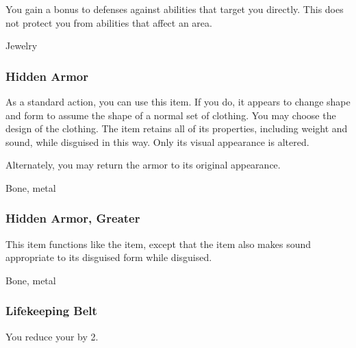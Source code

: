 You gain a  bonus to defenses against  abilities that target you directly.
This does not protect you from abilities that affect an area.



 


 Jewelry


\lowercase{\hypertarget{item:Hidden Armor}{}}\label{item:Hidden Armor}
\hypertarget{item:Hidden Armor}{\subsubsection{Hidden Armor\hfill{}}}

As a standard action, you can use this item.
If you do, it appears to change shape and form to assume the shape of a normal set of clothing.
You may choose the design of the clothing.
The item retains all of its properties, including weight and sound, while disguised in this way.
Only its visual appearance is altered.

Alternately, you may return the armor to its original appearance.



 


 Bone, metal


\lowercase{\hypertarget{item:Hidden Armor, Greater}{}}\label{item:Hidden Armor, Greater}
\hypertarget{item:Hidden Armor, Greater}{\subsubsection{Hidden Armor, Greater\hfill{}}}

This item functions like the  item, except that the item also makes sound appropriate to its disguised form while disguised.



 


 Bone, metal


\lowercase{\hypertarget{item:Lifekeeping Belt}{}}\label{item:Lifekeeping Belt}
\hypertarget{item:Lifekeeping Belt}{\subsubsection{Lifekeeping Belt\hfill{}}}

You reduce your  by 2.



